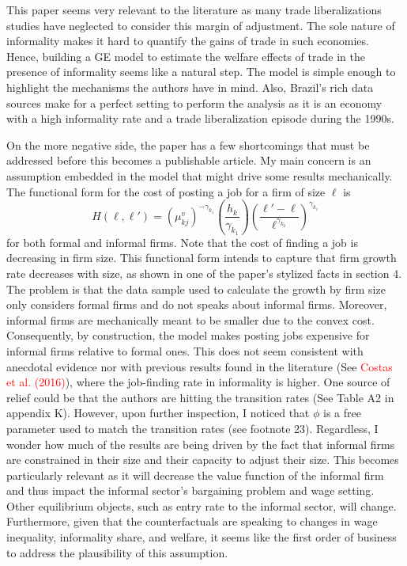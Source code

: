 \documentclass[12pt,oneside,reqno]{amsart}
\begin{document}
This paper seems very relevant to the literature as many trade liberalizations studies have neglected to consider this margin of adjustment. The sole nature of informality makes it hard to quantify the gains of trade in such economies. Hence, building a GE model to estimate the welfare effects of trade in the presence of informality seems like a natural step. The model is simple enough to highlight the mechanisms the authors have in mind. Also, Brazil's rich data sources make for a perfect setting to perform the analysis as it is an economy with a high informality rate and a trade liberalization episode during the 1990s. 

On the more negative side, the paper has a few shortcomings that must be addressed before this becomes a publishable article. My main concern is an assumption embedded in the model that might drive some results mechanically. The functional form for the cost of posting a job for a firm of size $\ell$ is 
\begin{equation*}
    H(\ell,\ell') = \left(\mu_{kj}^v\right)^{-\gamma_{k_1}}\left(\frac{h_k}{\gamma_{k_1}}\right)\left(\frac{\ell'-\ell}{\ell^{\gamma_{k_2}}}\right)^{\gamma_{k_1}}
\end{equation*}
for both formal and informal firms. Note that the cost of finding a job is decreasing in firm size. This functional form intends to capture that firm growth rate decreases with size, as shown in one of the paper's stylized facts in section 4. The problem is that the data sample used to calculate the growth by firm size only considers formal firms and do not speaks about informal firms. Moreover, informal firms are mechanically meant to be smaller due to the convex cost. Consequently, by construction, the model makes posting jobs expensive for informal firms relative to formal ones. This does not seem consistent with anecdotal evidence nor with previous results found in the literature (See \textcolor{red}{Costas et al. (2016)}), where the job-finding rate in informality is higher. One source of relief could be that the authors are hitting the transition rates (See Table A2 in appendix K). However, upon further inspection, I noticed that $\phi$ is a free parameter used to match the transition rates (see footnote 23). Regardless, I wonder how much of the results are being driven by the fact that informal firms are constrained in their size and their capacity to adjust their size. This becomes particularly relevant as it will decrease the value function of the informal firm and thus impact the informal sector's bargaining problem and wage setting. Other equilibrium objects, such as entry rate to the informal sector, will change. Furthermore, given that the counterfactuals are speaking to changes in wage inequality, informality share,  and welfare, it seems like the first order of business to address the plausibility of this assumption. 
\end{document}
